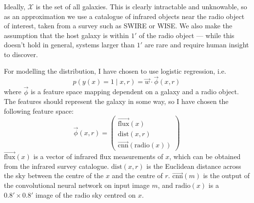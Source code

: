 \documentclass[11pt]{book}
\begin{document}
    Ideally, $\mathcal X$ is the set of all galaxies. This is clearly intractable and unknowable, so as an approximation we use a catalogue of infrared objects near the radio object of interest, taken from a survey such as SWIRE or WISE. We also make the assumption that the host galaxy is within $1'$ of the radio object --- while this doesn't hold in general, systems larger than $1'$ are rare and require human insight to discover\cite{banfield16}.

    For modelling the distribution, I have chosen to use logistic regression, i.e.
    \begin{equation}
        \label{eq:logistic-regression-cross-identification}
        p(y(x) = 1 \mid x, r) = \vec w \cdot \vec \phi(x, r)
    \end{equation}
    where $\vec \phi$ is a feature space mapping dependent on a galaxy and a radio object. The features should represent the galaxy in some way, so I have chosen the following feature space:
    \begin{equation}
        \label{eq:galaxy-features}
        \vec \phi(x, r) = \begin{pmatrix}
            \vec{\mbox{flux}}(x)\\
            \mbox{dist}(x, r)\\
            \vec{\mbox{cnn}}(\mbox{radio}(x))
        \end{pmatrix}
    \end{equation}
    $\vec{\mbox{flux}}(x)$ is a vector of infrared flux measurements of $x$, which can be obtained from the infrared survey catalogue. $\mbox{dist}(x, r)$ is the Euclidean distance across the sky between the centre of the $x$ and the centre of $r$. $\vec{\mbox{cnn}}(m)$ is the output of the convolutional neural network on input image $m$, and $\mbox{radio}(x)$ is a $0.8' \times 0.8'$ image of the radio sky centred on $x$.






\backmatter




\printindex
\end{document}
